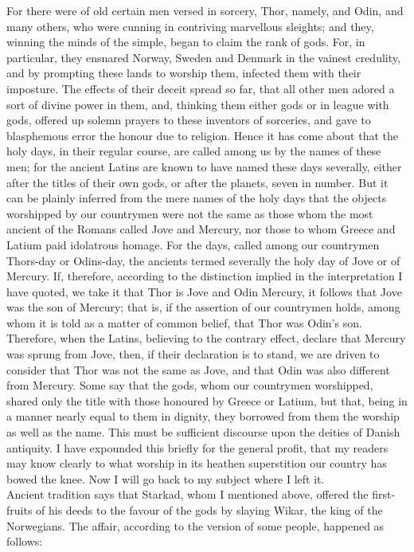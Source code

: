 \documentclass[10pt,a4paper]{report}
\begin{document}
For there were of old certain men versed in sorcery, Thor, namely, and Odin, and many others, who were cunning in contriving marvellous sleights; and they, winning the minds of the simple, began to claim the rank of gods. For, in particular, they ensnared Norway, Sweden and Denmark in the vainest credulity, and by prompting these lands to worship them, infected them with their imposture. The effects of their deceit spread so far, that all other men adored a sort of divine power in them, and, thinking them either gods or in league with gods, offered up solemn prayers to these inventors of sorceries, and gave to blasphemous error the honour due to religion. Hence it has come about that the holy days, in their regular course, are called among us by the names of these men; for the ancient Latins are known to have named these days severally, either after the titles of their own gods, or after the planets, seven in number. But it can be plainly inferred from the mere names of the holy days that the objects worshipped by our countrymen were not the same as those whom the most ancient of the Romans called Jove and Mercury, nor those to whom Greece and Latium paid idolatrous homage. For the days, called among our countrymen Thors-day or Odins-day, the ancients termed severally the holy day of Jove or of Mercury. If, therefore, according to the distinction implied in the interpretation I have quoted, we take it that Thor is Jove and Odin Mercury, it follows that Jove was the son of Mercury; that is, if the assertion of our countrymen holds, among whom it is told as a matter of common belief, that Thor was Odin's son. Therefore, when the Latins, believing to the contrary effect, declare that Mercury was sprung from Jove, then, if their declaration is to stand, we are driven to consider that Thor was not the same as Jove, and that Odin was also different from Mercury. Some say that the gods, whom our countrymen worshipped, shared only the title with those honoured by Greece or Latium, but that, being in a manner nearly equal to them in dignity, they borrowed from them the worship as well as the name. This must be sufficient discourse upon the deities of Danish antiquity. I have expounded this briefly for the general profit, that my readers may know clearly to what worship in its heathen superstition our country has bowed the knee. Now I will go back to my subject where I left it.\\

Ancient tradition says that Starkad, whom I mentioned above, offered the first-fruits of his deeds to the favour of the gods by slaying Wikar, the king of the Norwegians. The affair, according to the version of some people, happened as follows:\\
\end{document}
